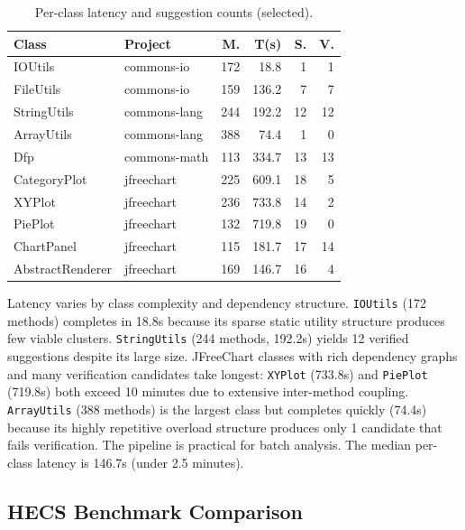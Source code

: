 \documentclass[sigconf]{acmart}
\begin{document}
\begin{table}[t]
\centering\small
\caption{Per-class latency and suggestion counts (selected).}
\label{tab:rq4}
\begin{tabular}{@{}llrrrr@{}}
\toprule
\textbf{Class} & \textbf{Project} & \textbf{M.} & \textbf{T(s)} & \textbf{S.} & \textbf{V.} \\
\midrule
IOUtils          & commons-io   & 172 &  18.8 &  1 &  1 \\
FileUtils        & commons-io   & 159 & 136.2 &  7 &  7 \\
StringUtils      & commons-lang & 244 & 192.2 & 12 & 12 \\
ArrayUtils       & commons-lang & 388 &  74.4 &  1 &  0 \\
Dfp              & commons-math & 113 & 334.7 & 13 & 13 \\
CategoryPlot     & jfreechart   & 225 & 609.1 & 18 &  5 \\
XYPlot           & jfreechart   & 236 & 733.8 & 14 &  2 \\
PiePlot          & jfreechart   & 132 & 719.8 & 19 &  0 \\
ChartPanel       & jfreechart   & 115 & 181.7 & 17 & 14 \\
AbstractRenderer & jfreechart   & 169 & 146.7 & 16 &  4 \\
\bottomrule
\end{tabular}
\end{table}

Latency varies by class complexity and dependency structure. \texttt{IOUtils}
(172 methods) completes in 18.8s because its sparse static utility structure
produces few viable clusters. \texttt{StringUtils} (244 methods, 192.2s) yields
12 verified suggestions despite its large size. JFreeChart classes with rich
dependency graphs and many verification candidates take longest: \texttt{XYPlot}
(733.8s) and \texttt{PiePlot} (719.8s) both exceed 10 minutes due to extensive
inter-method coupling. \texttt{ArrayUtils} (388 methods) is the largest class
but completes quickly (74.4s) because its highly repetitive overload structure
produces only 1 candidate that fails verification. The pipeline is practical for
batch analysis. The median per-class latency is 146.7s (under 2.5 minutes).

\subsection{HECS Benchmark Comparison}
\label{sec:hecs}
\end{document}
